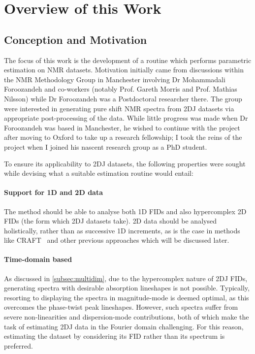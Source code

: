\section{Overview of this Work}

\subsection{Conception and Motivation}
The focus of this work is the development of a routine which performs
parametric estimation on \ac{NMR} datasets.
Motivation initially came from discussions within the NMR
Methodology Group in Manchester involving
Dr Mohammadali Foroozandeh and co-workers (notably Prof.  Gareth Morris and
Prof. Mathias Nilsson) while Dr Foroozandeh was a
Postdoctoral researcher there. The group were interested in generating pure
shift \ac{NMR} spectra from \ac{2DJ} datasets via appropriate post-processing
of the data.  While little progress was made when Dr Foroozandeh was based in
Manchester, he wished to continue with the project after moving to Oxford to
take up a research fellowship; I took the reins of the project when I joined
his nascent research group as a PhD student.

To ensure its applicability to \ac{2DJ} datasets, the following properties were
sought while devising what a suitable estimation routine would entail:

\paragraph{Support for \ac{1D} and \ac{2D} data}
The method should be able to analyse both \ac{1D} \acp{FID} and also
hypercomplex \ac{2D} \acp{FID} (the form which \ac{2DJ} datasets take).
\ac{2D} data should be analysed holistically,
rather than as successive \ac{1D} increments, as is the case in methods like
\ac{CRAFT}~\cite{Krishnamurthy2017} and other previous approaches which will be
discussed later. \label{corr:1d-vs-2d}

\paragraph{Time-domain based}
As discussed in \cref{subsec:multidim}, due to the hypercomplex nature of
\ac{2DJ} \acp{FID}, generating spectra with desirable absorption lineshapes is
not possible. Typically, resorting to displaying the spectra in magnitude-mode is
deemed optimal, as this overcomes the phase-twist peak lineshapes. However,
such spectra suffer from severe non-linearities and dispersion-mode
contributions, both of which make the task of estimating \ac{2DJ} data in the
Fourier domain challenging. For this reason, estimating the dataset by
considering its \ac{FID} rather than its spectrum is preferred.

